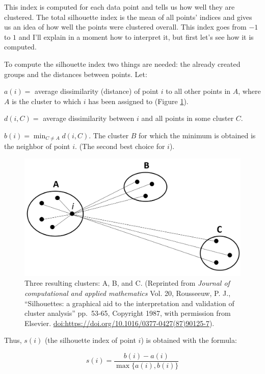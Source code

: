 \documentclass[
  11pt,
]{krantz}
\begin{document}
This index is computed for each data point and tells us how well they are clustered. The total silhouette index is the mean of all points' indices and gives us an idea of how well the points were clustered overall. This index goes from \(-1\) to \(1\) and I'll explain in a moment how to interpret it, but first let's see how it is computed.

To compute the silhouette index two things are needed: the already created groups and the distances between points. Let:

\(a(i)=\) average dissimilarity (distance) of point \(i\) to all other points in \(A\), where \(A\) is the cluster to which \(i\) has been assigned to (Figure \ref{fig:3clust}).

\(d(i,C)=\) average dissimilarity between \(i\) and all points in some cluster \(C\).

\(b(i)=\min_{C \neq A}d(i,C)\). The cluster \(B\) for which the minimum is obtained is the neighbor of point \(i\). (The second best choice for \(i\)).



\begin{figure}

{\centering \includegraphics[width=0.8\linewidth]{images/3clusters} 

}

\caption{Three resulting clusters: A, B, and C. (Reprinted from \emph{Journal of computational and applied mathematics} Vol. 20, Rousseeuw, P. J., ``Silhouettes: a graphical aid to the interpretation and validation of cluster analysis'' pp.~53-65, Copyright 1987, with permission from Elsevier. \url{doi:https://doi.org/10.1016/0377-0427(87)90125-7}).}\label{fig:3clust}
\end{figure}

Thus, \(s(i)\) (the silhouette index of point \(i\)) is obtained with the formula:

\begin{equation}
s(i) = \frac{{b(i) - a(i)}}{{\max \{ a(i),b(i)\} }}
\label{eq:silindex}
\end{equation}
\end{document}
